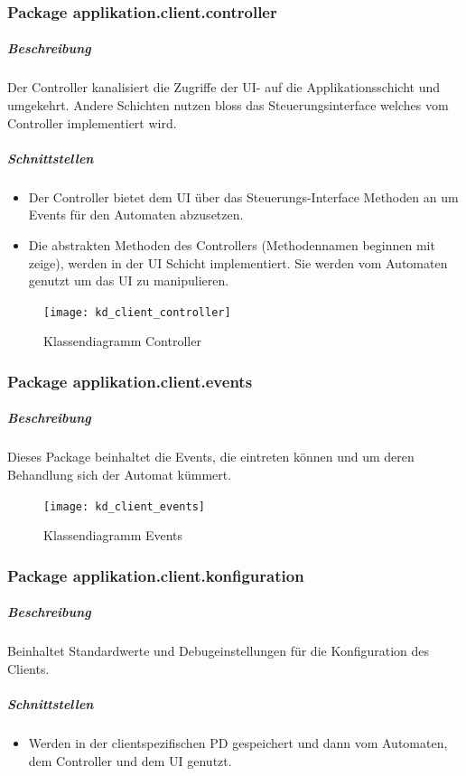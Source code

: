 \documentclass[12pt,halfparskip]{scrartcl}
\begin{document}
	\subsubsection{Package applikation.client.controller}
		\subparagraph{Beschreibung}
		Der Controller kanalisiert die Zugriffe der UI- auf die Applikationsschicht und umgekehrt. Andere Schichten nutzen bloss das Steuerungsinterface welches vom Controller implementiert wird.

		\subparagraph{Schnittstellen}
		\begin{itemize}
			\item Der Controller bietet dem UI über das Steuerungs-Interface Methoden an um Events für den Automaten abzusetzen.
			\item Die abstrakten Methoden des Controllers (Methodennamen beginnen mit zeige), werden in der UI Schicht implementiert. Sie werden vom Automaten genutzt um das UI zu manipulieren.
		\end{itemize}

		\begin{figure}[h]
			\centering
			\texttt{[image: kd\_client\_controller]}
			\caption{Klassendiagramm Controller}
			\label{fig:kd_client_controller}
		\end{figure}
		
	\subsubsection{Package applikation.client.events}
		\subparagraph{Beschreibung}
		Dieses Package beinhaltet die Events, die eintreten können und um deren Behandlung sich der Automat kümmert.
		\begin{figure}[h]
			\centering
			\texttt{[image: kd\_client\_events]}
			\caption{Klassendiagramm Events}
			\label{fig:kd_client_events}
		\end{figure}
		
	\subsubsection{Package applikation.client.konfiguration}
		\subparagraph{Beschreibung}
		Beinhaltet Standardwerte und Debugeinstellungen für die Konfiguration des Clients.	

		\subparagraph{Schnittstellen}
		\begin{itemize}
			\item Werden in der clientspezifischen PD gespeichert und dann vom Automaten, dem Controller und dem UI genutzt.
		\end{itemize}
	
\end{document}

